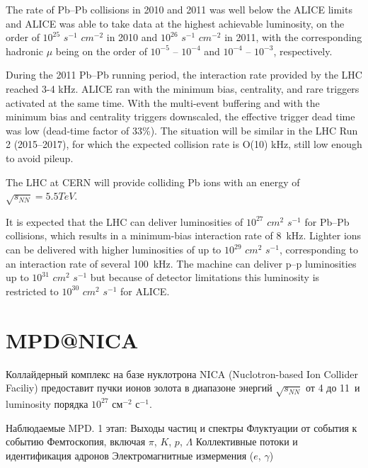 
The rate of Pb--Pb collisions in 2010 and 2011 was well below the ALICE limits and ALICE was able to take data at the highest achievable luminosity, on the order of $10^25$ $s^{-1}$ $cm^{-2}$ in 2010 and $10^{26}$ $s^{-1}$ $cm^{-2}$ in 2011, with the corresponding hadronic $\mu$ being on the order of $10^{-5}$ -- $10^{-4}$ and $10^{-4}$ -- $10^{-3}$, respectively.

During the 2011 Pb--Pb running period, the interaction rate provided by the LHC reached 3-4 kHz. ALICE ran with the minimum bias, centrality, and rare triggers activated at the same time. With the multi-event buffering and with the minimum bias and centrality triggers downscaled, the effective trigger dead time was low (dead-time factor of 33\%). The situation will be similar in the LHC Run 2 (2015--2017), for which the expected collision rate is O(10) kHz, still low enough to avoid pileup.

The LHC at CERN will provide colliding Pb ions with an energy of $\sqrt{s_{NN}}=5.5 TeV$.

It is expected that the LHC can deliver luminosities of $10^{27}$ $cm^{2}$ $s^{-1}$ for Pb--Pb collisions, which results in a minimum-bias interaction rate of 8~kHz. Lighter ions can be delivered with higher luminosities of up to $10^{29}$ $cm^{2}$ $s^{-1}$, corresponding to an interaction rate of several 100~kHz. The machine can deliver p--p luminosities up to $10^{31}$ $cm^{2}$ $s^{-1}$ but because of detector limitations this luminosity is restricted to $10^{30}$ $cm^{2}$ $s^{-1}$ for ALICE.

\section{MPD@NICA}

Коллайдерный комплекс на базе нуклотрона NICA (Nuclotron-based Ion Collider Faciliy) предоставит пучки ионов золота в диапазоне энергий $\sqrt{s_{NN}}$ от 4 до 11~\GeVperNucl и luminosity порядка $10^{27}$ см$^{-2}$ с$^{-1}$.



Наблюдаемые MPD.
1 этап:
Выходы частиц и спектры
Флуктуации от события к событию
Фемтоскопия, включая $\pi$, $K$, $p$, $\Lambda$
Коллективные потоки и идентификация адронов
Электромагнитные измермения ($e$, $\gamma$)

